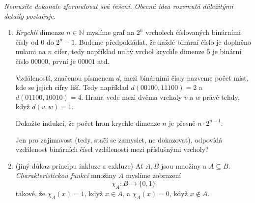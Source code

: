 \documentclass[a4paper,11pt]{article}
\newcommand{\N}{\mathbb{N}}
\begin{document}
 \begin{tcolorbox}[breakable,title=\textsf{Těžké úlohy a důkazy (15
  bodů)},arc=0mm,boxsep=3mm,bottomrule=1pt,toprule=1pt,leftrule=-0.1mm,
  rightrule=-0.1mm,colframe=BrickRed!80!white,colback=BrickRed!5!white]
  \emph{Nemusíte dokonale zformulovat svá řešení. Obecná idea rozvinutá
  důležitými detaily postačuje.}
  \begin{enumerate}
   \item \emph{Krychlí} dimenze $n \in \N$ myslíme graf na $2^{n}$ vrcholech
    číslovaných binárními čísly od $0$ do $2^{n} - 1$. Budeme předpokládat, že
    každé binární číslo je doplněno nulami na $n$ cifer, tedy například nultý
    vrchol krychle dimenze $5$ je binární číslo $00000$, první je $00001$ atd.
    
    Vzdáleností, značenou písmenem $d$, mezi binárními čísly nazveme počet míst,
    kde se jejich cifry liší. Tedy například $d(00100, 11100) = 2$ a
    $d(01100,10010) = 4$. Hrana vede mezi dvěma vrcholy $v$ a $w$ právě tehdy,
    když $d(v,w) = 1$.
   
    Dokažte indukcí, že počet hran krychle dimenze $n$ je přesně $n \cdot
    2^{n-1}$.

    Jen pro zajímavost (tedy, stačí se zamyslet, ne dokazovat), odpovídá
    vzdálenost binárních čísel vzdálenosti mezi příslušnými vrcholy?
   \item (jiný důkaz principu inkluze a exkluze) Ať $A,B$ jsou množiny a $A
    \subseteq B$. \emph{Charakteristickou funkcí} množiny $A$ myslíme zobrazení
    \[
     \chi_A: B \to \{0,1\}
    \]
    takové, že $\chi_A(x) = 1$, když $x \in A$, a $\chi_A(x) = 0$, když $x \notin
    A$.
   

\end{enumerate}
\end{tcolorbox}
\end{document}
